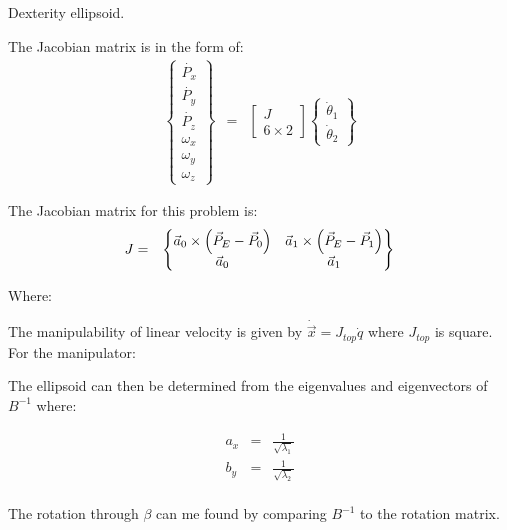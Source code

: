 Dexterity ellipsoid.

The Jacobian matrix is in the form of:
\begin{eqnarray}
\begin{Bmatrix}
\dot{P_x} \\
\dot{P_y} \\
\dot{P_z} \\
\omega_x \\
\omega_y \\
\omega_z
\end{Bmatrix} &=&
\begin{bmatrix}
J \\
6 \times 2
\end{bmatrix}
\begin{Bmatrix}
\dot{\theta}_1 \\
\dot{\theta}_2
\end{Bmatrix}
\end{eqnarray}

The Jacobian matrix for this problem is:
\begin{eqnarray}
J&=&\begin{Bmatrix}
\vec{a}_0 \times \left(\vec{P}_E-\vec{P}_{0}\right) 	&
\vec{a}_1 \times \left(\vec{P}_E-\vec{P}_{1}\right) 	\\
\vec{a}_0& \vec{a}_1 \\
\end{Bmatrix}
\end{eqnarray}

Where: 


The manipulability of linear velocity is given by $\dot{\vec{x}}=J_{top}\dot{q}$ where $J_{top}$ is square. For the manipulator:


The ellipsoid can then be determined from the eigenvalues and eigenvectors of $B^{-1}$ where:

\begin{eqnarray}
a_x&=&\frac{1}{\sqrt{\lambda_1}} \\
b_y&=&\frac{1}{\sqrt{\lambda_2}}  \\
\end{eqnarray}

The rotation through $\beta$ can me found by comparing $B^{-1}$ to the rotation matrix.



